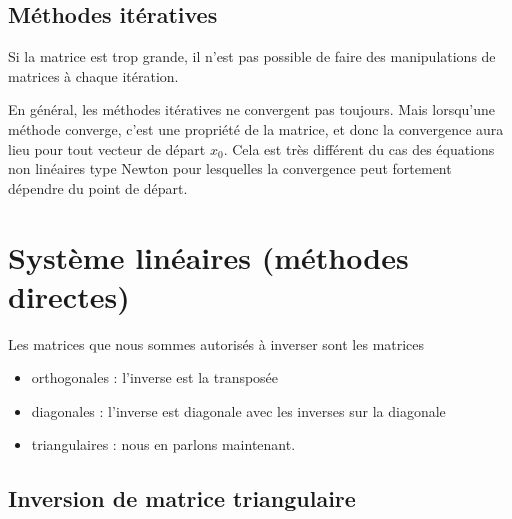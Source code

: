\subsection{Méthodes itératives}

Si la matrice est trop grande, il n'est pas possible de faire des manipulations de matrices à chaque itération.

En général, les méthodes itératives ne convergent pas toujours. Mais lorsqu'une méthode converge, c'est une propriété de la matrice, et donc la convergence aura lieu pour tout vecteur de départ \( x_0\). Cela est très différent du cas des équations non linéaires type Newton pour lesquelles la convergence peut fortement dépendre du point de départ.

\section{Système linéaires (méthodes directes)}

Les matrices que nous sommes autorisés à inverser sont les matrices
\begin{itemize}
    \item orthogonales : l'inverse est la transposée
    \item diagonales : l'inverse est diagonale avec les inverses sur la diagonale
    \item triangulaires : nous en parlons maintenant.
\end{itemize}

\subsection{Inversion de matrice triangulaire}

